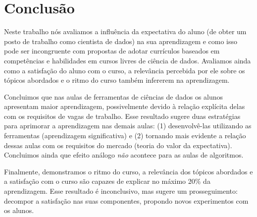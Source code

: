 \section{Conclusão}
\label{sec:conclusao}

Neste trabalho nós avaliamos a influência da expectativa do aluno (de obter um posto de trabalho como cientista de dados) na sua aprendizagem e como isso pode ser incongruente com propostas de adotar currículos baseados em competências e habilidades em cursos livres de ciência de dados.
Avaliamos ainda como a satisfação do aluno com o curso, a relevância percebida por ele sobre os tópicos abordados e o ritmo do curso também infererem na aprendizagem.

Concluimos que nas aulas de ferramentas de ciências de dados os alunos apresentam maior aprendizagem, possivelmente devido à relação explícita delas com os requisitos de vagas de trabalho.
Esse resultado sugere duas estratégias para aprimorar a aprendizagem nas demais aulas: (1) desenvolvê-las utilizando as ferramentas (aprendizagem significativa) e (2) tornando mais evidente a relação dessas aulas com os requisitos do mercado (teoria do valor da expectativa).
Concluimos ainda que efeito análogo \emph{não} acontece para as aulas de algoritmos.

Finalmente, demonstramos o ritmo do curso, a relevância dos tópicos abordados e a satisfação com o curso são capazes de explicar no máximo 20\% da aprendizagem.
Esse resultado é inconclusivo, mas sugere um prosseguimento: decompor a satisfação nas suas componentes, propondo novos experimentos com os alunos.
